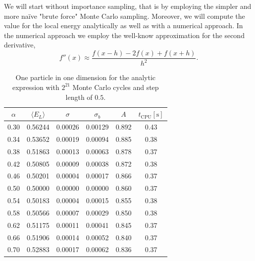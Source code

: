 \documentclass[
    a4paper, aps, twocolumn, floatfix, superscriptaddress,
    nofootinbib]{revtex4-1}
\newcommand{\1}{\mathds{1}}
\begin{document}
        We will start without importance sampling, that is by employing the
        simpler and more naïve "brute force" Monte Carlo sampling. Moreover, we
        will compute the value for the local energy analytically as well as with
        a numerical approach.  In the numerical approach we employ the well-know
        approximation for the second derivative,
        \begin{equation}
                f''(x) \approx \frac{f(x-h) - 2f(x) + f(x+h)}{h^2}.
        \end{equation}

        \begin{table}
            \centering
            \caption{One particle in one dimension for the analytic expression
            with $2^{21}$ Monte Carlo cycles and step length of $0.5$.}
            \begin{ruledtabular}
                \begin{tabular}{cccccc}
                    $\alpha$ & $\langle  E_L\rangle$ & $\sigma$ & $\sigma_b$
                    & $A$ & $t_{\text{CPU}} [\si{\second}]$ \\
                    \hline
                    0.30&0.56244&0.00026&0.00129&0.892&0.43\\
                    0.34&0.53652&0.00019&0.00094&0.885&0.38\\
                    0.38&0.51863&0.00013&0.00063&0.878&0.37\\
                    0.42&0.50805&0.00009&0.00038&0.872&0.38\\
                    0.46&0.50201&0.00004&0.00017&0.866&0.37\\
                    0.50&0.50000&0.00000&0.00000&0.860&0.37\\
                    0.54&0.50183&0.00004&0.00015&0.855&0.38\\
                    0.58&0.50566&0.00007&0.00029&0.850&0.38\\
                    0.62&0.51175&0.00011&0.00041&0.845&0.37\\
                    0.66&0.51906&0.00014&0.00052&0.840&0.37\\
                    0.70&0.52883&0.00017&0.00062&0.836&0.37\\
                \end{tabular}
            \end{ruledtabular}
            \label{tab:1D1N_analytic}
        \end{table}
\end{document}
